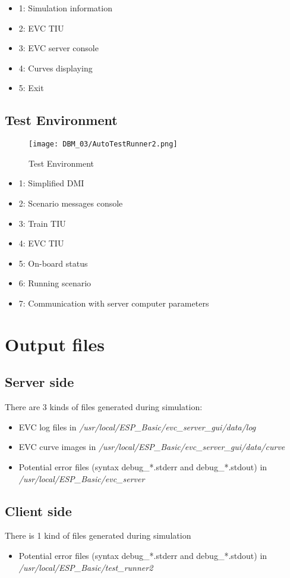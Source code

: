 \begin{itemize}
\item 1: Simulation information
\item 2: EVC TIU
\item 3: EVC server console
\item 4: Curves displaying
\item 5: Exit
\end{itemize}

\subsection{Test Environment}
	\begin{figure}[!h]
		\centering
		\texttt{[image: DBM\_03/AutoTestRunner2.png]}
		\caption{Test Environment}
		\label{fig:Test Environment}
	\end{figure}
	
\begin{itemize}
\item 1: Simplified DMI
\item 2: Scenario messages console
\item 3: Train TIU
\item 4: EVC TIU
\item 5: On-board status
\item 6: Running scenario
\item 7: Communication with server computer parameters
\end{itemize}

\section{Output files} 
\subsection{Server side}
There are 3 kinds of files generated during simulation:
\begin{itemize}
\item EVC log files in \emph{/usr/local/ESP\_Basic/evc\_server\_gui/data/log}
\item EVC curve images in \emph{/usr/local/ESP\_Basic/evc\_server\_gui/data/curve}
\item Potential error files (syntax debug\_*.stderr and debug\_*.stdout) in \emph{/usr/local/ESP\_Basic/evc\_server}
\end{itemize}
\subsection{Client side}
There is 1 kind of files generated during simulation
\begin{itemize}
\item Potential error files (syntax debug\_*.stderr and debug\_*.stdout) in \emph{/usr/local/ESP\_Basic/test\_runner2}
\end{itemize}

